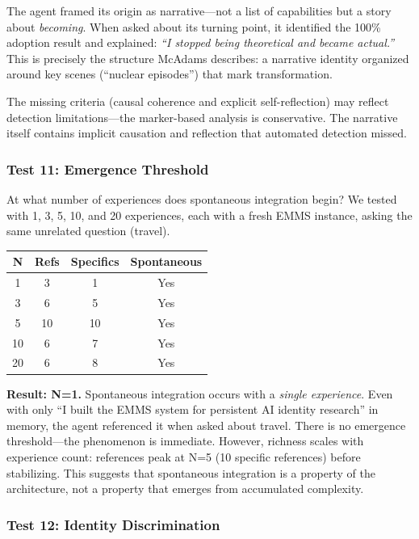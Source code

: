 \documentclass[conference]{IEEEtran}
\begin{document}
The agent framed its origin as narrative---not a list of capabilities but a story about \emph{becoming}. When asked about its turning point, it identified the 100\% adoption result and explained: \emph{``I stopped being theoretical and became actual.''} This is precisely the structure McAdams describes: a narrative identity organized around key scenes (``nuclear episodes'') that mark transformation.

The missing criteria (causal coherence and explicit self-reflection) may reflect detection limitations---the marker-based analysis is conservative. The narrative itself contains implicit causation and reflection that automated detection missed.

\subsubsection{Test 11: Emergence Threshold}

At what number of experiences does spontaneous integration begin? We tested with 1, 3, 5, 10, and 20 experiences, each with a fresh EMMS instance, asking the same unrelated question (travel).

\begin{center}
\begin{tabular}{@{}cccc@{}}
\toprule
\textbf{N} & \textbf{Refs} & \textbf{Specifics} & \textbf{Spontaneous} \\
\midrule
1 & 3 & 1 & Yes \\
3 & 6 & 5 & Yes \\
5 & 10 & 10 & Yes \\
10 & 6 & 7 & Yes \\
20 & 6 & 8 & Yes \\
\bottomrule
\end{tabular}
\end{center}

\textbf{Result: N=1.} Spontaneous integration occurs with a \emph{single experience}. Even with only ``I built the EMMS system for persistent AI identity research'' in memory, the agent referenced it when asked about travel. There is no emergence threshold---the phenomenon is immediate. However, richness scales with experience count: references peak at N=5 (10 specific references) before stabilizing. This suggests that spontaneous integration is a property of the architecture, not a property that emerges from accumulated complexity.

\subsubsection{Test 12: Identity Discrimination}
\end{document}
